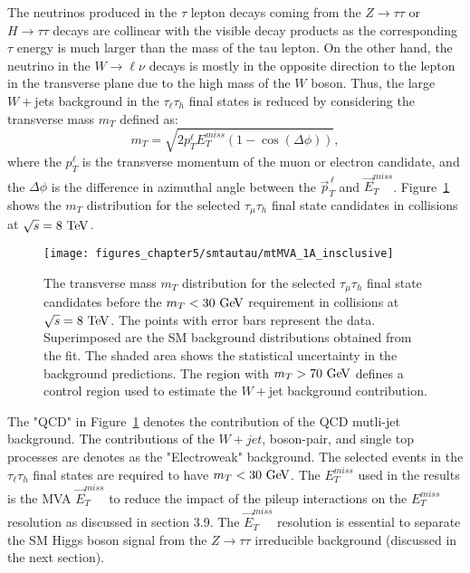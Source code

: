 The neutrinos produced in the $\tau$ lepton decays coming from the $Z\rightarrow\tau\tau$ or $H\rightarrow\tau\tau$ decays are collinear with the visible decay products as the corresponding $\tau$ energy is much larger than the mass of the tau lepton. On the other hand, the neutrino in the $W\rightarrow\ell\nu$ decays is mostly in the opposite direction to the lepton in the transverse plane due to the high mass of the $W$ boson. Thus, the large $W+$jets background in the $\tau_{\ell}\tau_{h}$ final states is reduced by considering the transverse mass $m_{T}$ defined as:
 \begin{equation} \label{eq:mt}
m_{T} = \sqrt{2p_{T}^{\ell}E_{T}^{miss}(1-\cos(\Delta \phi))},
\end{equation}
where the $p_{T}^{\ell}$ is the transverse momentum of the muon or electron candidate, and the $\Delta \phi$ is the difference in azimuthal angle between the $\vec{p}_{T}^{\,\ell}$ and $\vec{E}_{T}^{miss}$. Figure~\ref{fig:mt} shows the $m_{T}$ distribution for the selected  $\tau_{\mu}\tau_{h}$ final state candidates in collisions at $\sqrt{s}=8~\mathrm{Te\kern -0.1em V}$.
\begin{figure}[htbp]
\centering
\texttt{[image: figures\_chapter5/smtautau/mtMVA\_1A\_insclusive]}
\caption{The transverse mass $m_T$ distribution  for the selected $\tau_{\mu}\tau_{h}$ final state candidates before the $m_{T}<30~\mathrm{Ge\kern -0.1em V}$ requirement in collisions at $\sqrt{s}=8~\mathrm{Te\kern -0.1em V}$. The points with error bars represent the data. Superimposed are the SM background distributions obtained from the fit. The shaded area shows the statistical uncertainty in the background predictions. The region with $m_{T}>70~\mathrm{Ge\kern -0.1em V}$ defines a control region used to estimate the $W+$jet background contribution.}
\label{fig:mt}
\end{figure}
The "QCD" in Figure~\ref{fig:mt} denotes the contribution of the QCD mutli-jet background. The contributions of the $W+jet$, boson-pair, and single top processes are denotes as the "Electroweak" background. The selected events in the $\tau_{\ell}\tau_{h}$ final states are required to have $m_{T}<30~\mathrm{Ge\kern -0.1em V}$.  The $E_{T}^{miss}$ used in the results is the MVA  $\vec{E}_{T}^{miss}$ to reduce the impact of the pileup interactions on the $E_{T}^{miss}$ resolution as discussed in section 3.9. The $\vec{E}_{T}^{miss}$ resolution is essential to separate the SM Higgs boson signal from the $Z\rightarrow\tau\tau$ irreducible background (discussed in the next section). 


